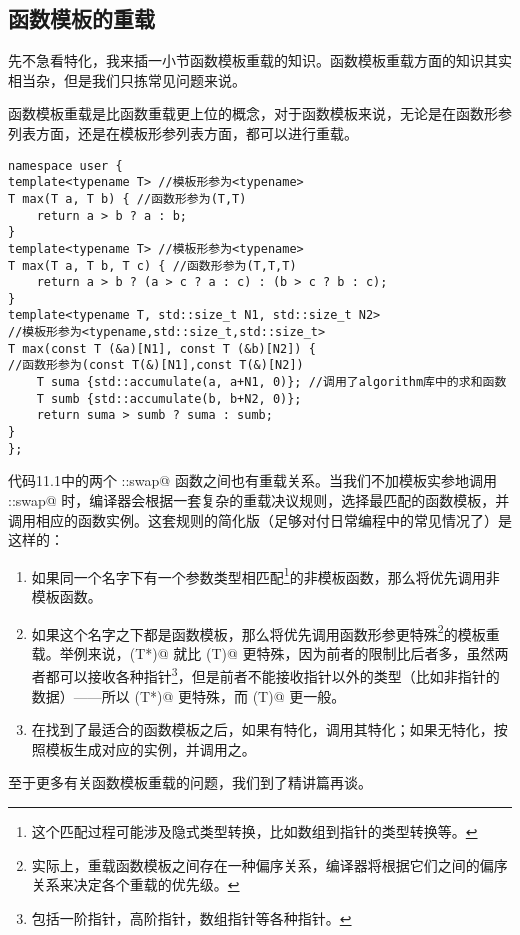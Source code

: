 \subsection*{函数模板的重载}
先不急看特化，我来插一小节函数模板重载的知识。函数模板重载方面的知识其实相当杂，但是我们只拣常见问题来说。\par
函数模板重载是比函数重载更上位的概念，对于函数模板来说，无论是在函数形参列表方面，还是在模板形参列表方面，都可以进行重载。\par
\begin{lstlisting}
namespace user {
template<typename T> //模板形参为<typename>
T max(T a, T b) { //函数形参为(T,T)
    return a > b ? a : b;
}
template<typename T> //模板形参为<typename>
T max(T a, T b, T c) { //函数形参为(T,T,T)
    return a > b ? (a > c ? a : c) : (b > c ? b : c);
}
template<typename T, std::size_t N1, std::size_t N2>
//模板形参为<typename,std::size_t,std::size_t>
T max(const T (&a)[N1], const T (&b)[N2]) {
//函数形参为(const T(&)[N1],const T(&)[N2])
    T suma {std::accumulate(a, a+N1, 0)}; //调用了algorithm库中的求和函数
    T sumb {std::accumulate(b, b+N2, 0)};
    return suma > sumb ? suma : sumb;
}
};
\end{lstlisting}\par
代码11.1中的两个 \lstinline@user::swap@ 函数之间也有重载关系。当我们不加模板实参地调用 \lstinline@user::swap@ 时，编译器会根据一套复杂的重载决议规则，选择最匹配的函数模板，并调用相应的函数实例。这套规则的简化版（足够对付日常编程中的常见情况了）是这样的：
\begin{enumerate}
    \item 如果同一个名字下有一个参数类型相匹配\footnote{这个匹配过程可能涉及隐式类型转换，比如数组到指针的类型转换等。}的非模板函数，那么将优先调用非模板函数。
    \item 如果这个名字之下都是函数模板，那么将优先调用函数形参更特殊\footnote{实际上，重载函数模板之间存在一种偏序关系，编译器将根据它们之间的偏序关系来决定各个重载的优先级。}的模板重载。举例来说，\lstinline@fun(T*)@ 就比 \lstinline@fun(T)@ 更特殊，因为前者的限制比后者多，虽然两者都可以接收各种指针\footnote{包括一阶指针，高阶指针，数组指针等各种指针。}，但是前者不能接收指针以外的类型（比如非指针的数据）——所以 \lstinline@fun(T*)@ 更特殊，而 \lstinline@fun(T)@ 更一般。
    \item 在找到了最适合的函数模板之后，如果有特化，调用其特化；如果无特化，按照模板生成对应的实例，并调用之。
\end{enumerate}\par
至于更多有关函数模板重载的问题，我们到了精讲篇再谈。\par
